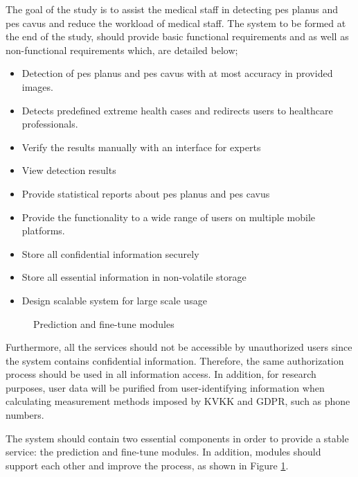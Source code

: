 The goal of the study is to assist the medical staff in detecting pes planus and pes cavus and reduce the workload of medical staff. The system to be formed at the end of the study, should provide basic functional requirements and as well as non-functional requirements which, are detailed below;
\begin{itemize}
  \item Detection of pes planus and pes cavus with at most accuracy in provided images.
  \item Detects predefined extreme health cases and redirects users to healthcare professionals.
  \item Verify the results manually with an interface for experts
  \item View detection results
  \item Provide statistical reports about pes planus and pes cavus  
  \item Provide the functionality to a wide range of users on multiple mobile platforms.
  \item Store all confidential information securely
  \item Store all essential information in non-volatile storage
  \item Design scalable system for large scale usage
\end{itemize}

\begin{figure}[htbp]
\centering
{}
\caption{Prediction and fine-tune modules}
\label{fig:PredictionAndFinetuneModules}
\end{figure}

Furthermore, all the services should not be accessible by unauthorized users since the system contains confidential information. Therefore, the same authorization process should be used in all information access. In addition, for research purposes, user data will be purified from user-identifying information when calculating measurement methods imposed by KVKK and GDPR, such as phone numbers.

The system should contain two essential components in order to provide a stable service: the prediction and fine-tune modules. In addition, modules should support each other and improve the process, as shown in Figure \ref{fig:PredictionAndFinetuneModules}.

